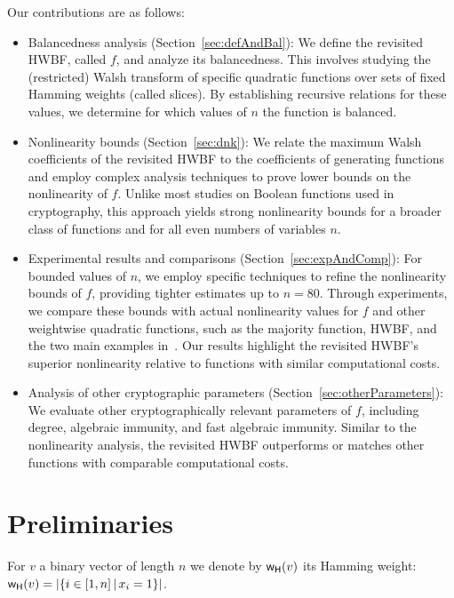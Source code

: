 \documentclass[11pt]{llncs}
\begin{document}
Our contributions are as follows:
\begin{itemize}
	\item Balancedness analysis (Section~\ref{sec:defAndBal}):
We define the revisited HWBF, called $f$, and analyze its balancedness. This involves studying the (restricted) Walsh transform of specific quadratic functions over sets of fixed Hamming weights (called slices). By establishing recursive relations for these values, we determine for which values of $n$ the function is balanced.

\item Nonlinearity bounds (Section~\ref{sec:dnk}):
We relate the maximum Walsh coefficients of the revisited HWBF to the coefficients of generating functions and employ complex analysis techniques to prove lower bounds on the nonlinearity of $f$. 
Unlike most studies on Boolean functions used in cryptography, this approach yields strong nonlinearity bounds for a broader class of functions and for all even numbers of variables $n$.

\item Experimental results and comparisons (Section~\ref{sec:expAndComp}): 
For bounded values of $n$, we employ specific techniques to refine the nonlinearity bounds of $f$, providing tighter estimates up to $n = 80$. Through experiments, we compare these bounds with actual nonlinearity values for $f$ and other weightwise quadratic functions, such as the majority function, HWBF, and the two main examples in~\cite{DAM:MeaOza24}. 
Our results highlight the revisited HWBF's superior nonlinearity relative to functions with similar computational costs.

\item Analysis of other cryptographic parameters (Section~\ref{sec:otherParameters}):  
We evaluate other cryptographically relevant parameters of $f$, including degree, algebraic immunity, and fast algebraic immunity. Similar to the nonlinearity analysis, the revisited HWBF outperforms or matches other functions with comparable computational costs.

\end{itemize}



\section{Preliminaries}

For $v$ a binary vector of length $n$ we denote by $\mathsf{w_H}(v)$ its Hamming weight: $\mathsf{w_H}(v)=|\{i\in [1,n] \, | \, x_i=1\}|$.
\end{document}
